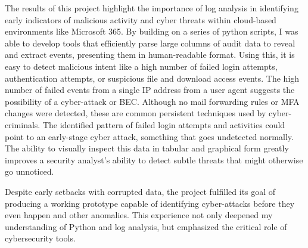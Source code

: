 \documentclass[12pt]{article}
\begin{document}
The results of this project highlight the importance of log analysis in identifying early indicators of malicious activity and cyber threats within cloud-based environments like Microsoft 365. By building on a series of python scripts, I was able to develop tools that efficiently parse large columns of audit data to reveal and extract events, presenting them in human-readable format. Using this, it is easy to detect malicious intent like a high number of failed login attempts, authentication attempts, or suspicious file and download access events. The high number of failed events from a single IP address from a user agent suggests the possibility of a cyber-attack or BEC. Although no mail forwarding rules or MFA changes were detected, these are common persistent techniques used by cyber-criminals. The identified pattern of failed login attempts and activities could point to an early-stage cyber attack, something that goes undetected normally. The ability to visually inspect this data in tabular and graphical form greatly improves a security analyst’s ability to detect subtle threats that might otherwise go unnoticed. 

Despite early setbacks with corrupted data, the project fulfilled its goal of producing a working prototype capable of identifying cyber-attacks before they even happen and other anomalies. This experience not only deepened my understanding of Python and log analysis, but emphasized the critical role of cybersecurity tools.
\end{document}
